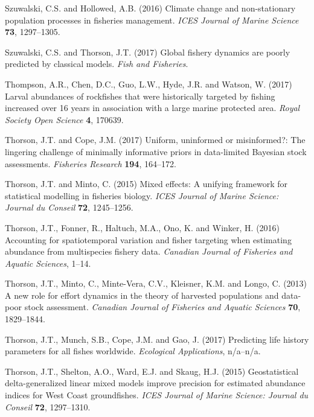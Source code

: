 \documentclass[twoside,12pt,final]{ucthesis-CA2012}
\begin{document}
\begin{ucmainmatter}
\hypertarget{ref-Szuwalski2016}{}
Szuwalski, C.S. and Hollowed, A.B. (2016) Climate change and
non-stationary population processes in fisheries management. \emph{ICES
Journal of Marine Science} \textbf{73}, 1297--1305.

\hypertarget{ref-Szuwalski2017}{}
Szuwalski, C.S. and Thorson, J.T. (2017) Global fishery dynamics are
poorly predicted by classical models. \emph{Fish and Fisheries}.

\hypertarget{ref-Thompson2017}{}
Thompson, A.R., Chen, D.C., Guo, L.W., Hyde, J.R. and Watson, W. (2017)
Larval abundances of rockfishes that were historically targeted by
fishing increased over 16 years in association with a large marine
protected area. \emph{Royal Society Open Science} \textbf{4}, 170639.

\hypertarget{ref-Thorson2017a}{}
Thorson, J.T. and Cope, J.M. (2017) Uniform, uninformed or misinformed?:
The lingering challenge of minimally informative priors in data-limited
Bayesian stock assessments. \emph{Fisheries Research} \textbf{194},
164--172.

\hypertarget{ref-Thorson2015b}{}
Thorson, J.T. and Minto, C. (2015) Mixed effects: A unifying framework
for statistical modelling in fisheries biology. \emph{ICES Journal of
Marine Science: Journal du Conseil} \textbf{72}, 1245--1256.

\hypertarget{ref-Thorson2016a}{}
Thorson, J.T., Fonner, R., Haltuch, M.A., Ono, K. and Winker, H. (2016)
Accounting for spatiotemporal variation and fisher targeting when
estimating abundance from multispecies fishery data. \emph{Canadian
Journal of Fisheries and Aquatic Sciences}, 1--14.

\hypertarget{ref-Thorson2013a}{}
Thorson, J.T., Minto, C., Minte-Vera, C.V., Kleisner, K.M. and Longo, C.
(2013) A new role for effort dynamics in the theory of harvested
populations and data-poor stock assessment. \emph{Canadian Journal of
Fisheries and Aquatic Sciences} \textbf{70}, 1829--1844.

\hypertarget{ref-Thorson2017d}{}
Thorson, J.T., Munch, S.B., Cope, J.M. and Gao, J. (2017) Predicting
life history parameters for all fishes worldwide. \emph{Ecological
Applications}, n/a--n/a.

\hypertarget{ref-Thorson2015a}{}
Thorson, J.T., Shelton, A.O., Ward, E.J. and Skaug, H.J. (2015)
Geostatistical delta-generalized linear mixed models improve precision
for estimated abundance indices for West Coast groundfishes. \emph{ICES
Journal of Marine Science: Journal du Conseil} \textbf{72}, 1297--1310.


\end{ucmainmatter}
\end{document}
